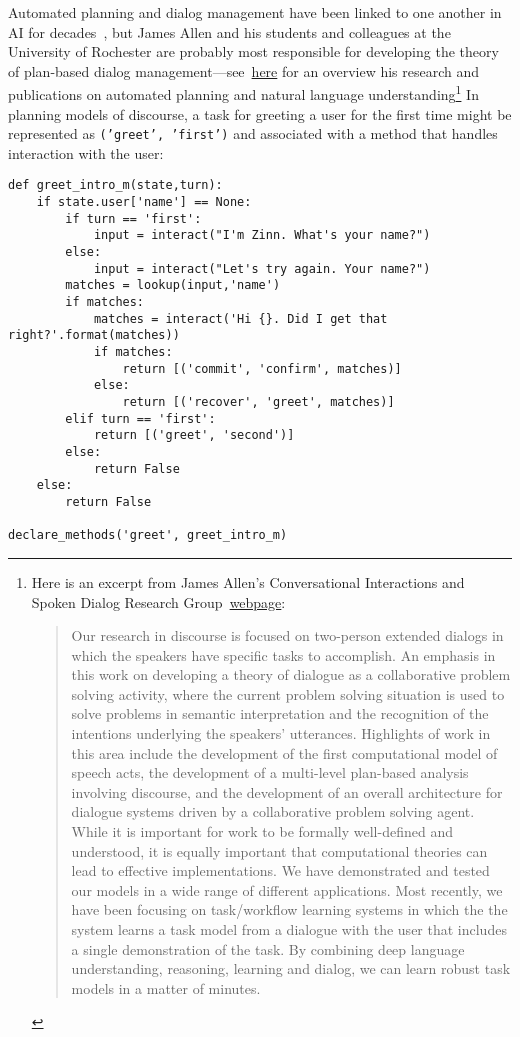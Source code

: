 \documentclass[letterpaper,11pt]{article}
\begin{document}
Automated planning and dialog management have been linked to one another in AI for decades~\cite{LitmanandAllenCS-87,WalkeretalACL-97,BohusandRudnickyCSL-09}, but James Allen and his students and colleagues at the University of Rochester are probably most responsible for developing the theory of plan-based dialog management---see~\href{http://www.cs.rochester.edu/~james/}{here} for an overview his research and publications on automated planning and natural language understanding\footnote{%
%
  Here is an excerpt from James Allen's Conversational Interactions and Spoken Dialog Research Group~\href{http://www.cs.rochester.edu/~james/}{webpage}:
%
  \begin{quotation}
%
    Our research in discourse is focused on two-person extended dialogs in which the speakers have specific tasks to accomplish. An emphasis in this work on developing a theory of dialogue as a collaborative problem solving activity, where the current problem solving situation is used to solve problems in semantic interpretation and the recognition of the intentions underlying the speakers' utterances. Highlights of work in this area include the development of the first computational model of speech acts, the development of a multi-level plan-based analysis involving discourse, and the development of an overall architecture for dialogue systems driven by a collaborative problem solving agent. While it is important for work to be formally well-defined and understood, it is equally important that computational theories can lead to effective implementations. We have demonstrated and tested our models in a wide range of different applications. Most recently, we have been focusing on task/workflow learning systems in which the the system learns a task model from a dialogue with the user that includes a single demonstration of the task. By combining deep language understanding, reasoning, learning and dialog, we can learn robust task models in a matter of minutes. 
%
  \end{quotation}}
%
In planning models of discourse, a task for greeting a user for the first time might be represented as {\tt{('greet', 'first')}} and associated with a method that handles interaction with the user:
%
\begin{verbatim}
def greet_intro_m(state,turn):
    if state.user['name'] == None:
        if turn == 'first':
            input = interact("I'm Zinn. What's your name?")
        else:
            input = interact("Let's try again. Your name?")
        matches = lookup(input,'name')
        if matches:
            matches = interact('Hi {}. Did I get that right?'.format(matches))
            if matches:
                return [('commit', 'confirm', matches)]
            else:
                return [('recover', 'greet', matches)]
        elif turn == 'first':
            return [('greet', 'second')]
        else:
            return False
    else:
        return False

declare_methods('greet', greet_intro_m)
\end{verbatim}
\end{document}
